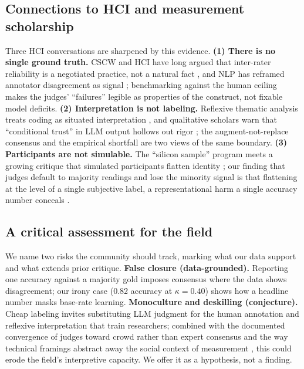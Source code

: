\subsection{Connections to HCI and measurement scholarship}
Three HCI conversations are sharpened by this evidence. \textbf{(1) There is no single ground truth.} CSCW and HCI
have long argued that inter-rater reliability is a negotiated practice, not a natural fact
\citep{mcdonald2019reliability}, and NLP has reframed annotator disagreement as signal \citep{aroyo2015truth,
plank2022humanlabel}; benchmarking against the human ceiling makes the judges' ``failures'' legible as properties of
the construct, not fixable model deficits. \textbf{(2) Interpretation is not labeling.} Reflexive thematic analysis
treats coding as situated interpretation \citep{braun2006thematic}, and qualitative scholars warn that ``conditional
trust'' in LLM output hollows out rigor \citep{schroeder2025usestensions,davison2024ethics}; the augment-not-replace
consensus and the empirical shortfall are two views of the same boundary. \textbf{(3) Participants are not
simulable.} The ``silicon sample'' program \citep{argyle2023outofone} meets a growing critique that simulated
participants flatten identity \citep{wang2024flatten,cheng2023compost,bisbee2023perils,salminen2025syntheticcritical};
our finding that judges default to majority readings and lose the minority signal is that flattening at the level of
a single subjective label, a representational harm a single accuracy number conceals \citep{fricker2007epistemic,
birhane2022values}.

\subsection{A critical assessment for the field}
We name two risks the community should track, marking what our data support and what extends prior critique.
\textbf{False closure (data-grounded).} Reporting one accuracy against a majority gold imposes consensus where the
data shows disagreement; our irony case (0.82 accuracy at $\kappa{=}0.40$) shows how a headline number masks
base-rate learning. \textbf{Monoculture and deskilling (conjecture).} Cheap labeling invites substituting LLM
judgment for the human annotation and reflexive interpretation that train researchers; combined with the documented
convergence of judges toward crowd rather than expert consensus \citep{bavaresco2024judgebench} and the way
technical framings abstract away the social context of measurement \citep{selbst2019abstraction,suchman2007humanmachine},
this could erode the field's interpretive capacity. We offer it as a hypothesis, not a finding.


